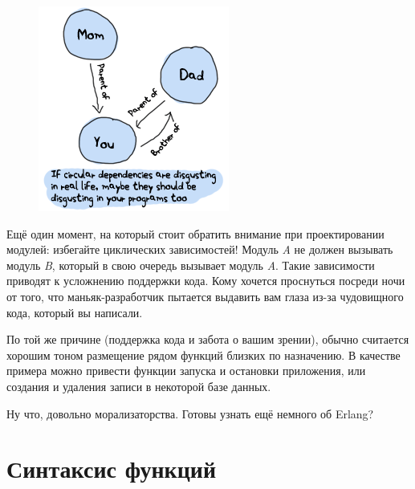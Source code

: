 \documentclass[a4paper,12pt]{report}
\begin{document}
\begin{figure}
    \includegraphics[width=1\linewidth]{circular-dependencies.png}
\end{figure}
Ещё один момент, на который стоит обратить внимание при проектировании модулей: избегайте циклических зависимостей! Модуль \emph{A} не должен вызывать модуль \emph{B}, который в свою очередь вызывает модуль \emph{A}. Такие зависимости приводят к усложнению поддержки кода. Кому хочется проснуться посреди ночи от того, что маньяк\--разработчик пытается выдавить вам глаза из\--за чудовищного кода, который вы написали.

По той же причине (поддержка кода и забота о вашим зрении), обычно считается хорошим тоном размещение рядом функций близких по назначению. В качестве примера можно привести функции запуска и остановки приложения, или создания и удаления записи в некоторой базе данных.

Ну что, довольно морализаторства. Готовы узнать ещё немного об Erlang?
\chapter{Синтаксис функций}
\label{syntax_in_functions}
\end{document}
